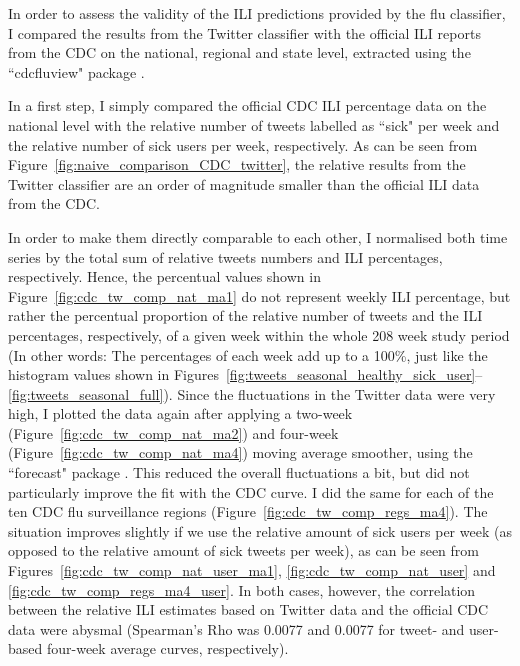 \documentclass[11pt, a4paper,twoside]{report}\usepackage[]{graphicx}\usepackage[]{color}
\begin{document}
In order to assess the validity of the ILI predictions provided by the flu classifier, I compared the results from the Twitter classifier with the official ILI reports from the CDC on the national, regional and state level, extracted using the ``cdcfluview" package \citep{cdcfluview}.

In a first step, I simply compared the official CDC ILI percentage data on the national level with the relative number of tweets labelled as ``sick" per week and the relative number of sick users per week, respectively. As can be seen from Figure~\ref{fig:naive_comparison_CDC_twitter}, the relative results from the Twitter classifier are an order of magnitude smaller than the official ILI data from the CDC.

In order to make them directly comparable to each other, I normalised both time series by the total sum of relative tweets numbers and ILI percentages, respectively. Hence, the percentual values shown in Figure~\ref{fig:cdc_tw_comp_nat_ma1} do not represent weekly ILI percentage, but rather the percentual proportion of the relative number of tweets and the ILI percentages, respectively, of a given week within the whole 208 week study period (In other words: The percentages of each week add up to a 100\%, just like the histogram values shown in Figures~\ref{fig:tweets_seasonal_healthy_sick_user}--\ref{fig:tweets_seasonal_full}). Since the fluctuations in the Twitter data were very high, I plotted the data again after applying a two-week (Figure~\ref{fig:cdc_tw_comp_nat_ma2}) and four-week (Figure~\ref{fig:cdc_tw_comp_nat_ma4}) moving average smoother, using the ``forecast" package \citep{forecast}. This reduced the overall fluctuations a bit, but did not particularly improve the fit with the CDC curve. I did the same for each of the ten CDC flu surveillance regions (Figure~\ref{fig:cdc_tw_comp_regs_ma4}). The situation improves slightly if we use the relative amount of sick users per week (as opposed to the relative amount of sick tweets per week), as can be seen  from Figures~\ref{fig:cdc_tw_comp_nat_user_ma1}, \ref{fig:cdc_tw_comp_nat_user} and \ref{fig:cdc_tw_comp_regs_ma4_user}. In both cases, however, the correlation between the relative ILI estimates based on Twitter data and the official CDC data were abysmal (Spearman's Rho was 0.0077 and 0.0077 for tweet- and user-based four-week average curves, respectively). 
\end{document}
